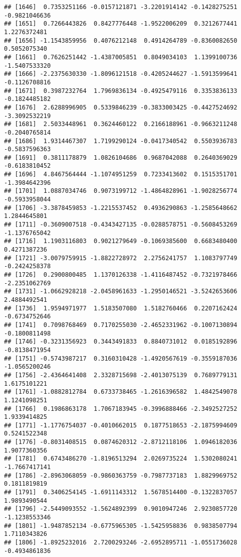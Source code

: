 \documentclass[
]{article}
\begin{document}
\begin{verbatim}
## [1646]  0.7353251166 -0.0157121871 -3.2201914142 -0.1428275251 -0.9821046636
## [1651]  0.7266443826  0.8427776448 -1.9522006209  0.3212677441  1.2276372481
## [1656] -1.1543859956  0.4076212148  0.4914264789 -0.8360082650  0.5052075340
## [1661]  0.7626251442 -1.4387005851  0.8049034103  1.1399100736 -1.5407533320
## [1666] -2.2375630330 -1.8096121518 -0.4205244627 -1.5913599641 -0.1126708816
## [1671]  0.3987232764  1.7969836134 -0.4925479116  0.3353836133 -0.1824485182
## [1676]  2.6288996905  0.5339846239 -0.3833003425 -0.4427524692 -3.3092532219
## [1681]  2.5033448961  0.3624460122  0.2166188961 -0.9663211248 -0.2040765814
## [1686]  1.9314467307  1.7199290124 -0.0417340542  0.5503936783 -0.5837596363
## [1691]  0.3811178879  1.0826104686  0.9687042088  0.2640369029 -0.6183810452
## [1696]  4.8467564444 -1.1074951259  0.7233413602  0.1515351701 -1.3984642396
## [1701]  1.0887034746  0.9073199712 -1.4864828961 -1.9028256774 -0.5933958044
## [1706] -3.3878459853 -1.2215537452  0.4936290863 -1.2585648662  1.2844645801
## [1711] -0.3609007518 -0.4343427135 -0.0288578751 -0.5608453269 -1.1376765042
## [1716]  1.1903116803  0.9021279649 -0.1069385600  0.6683480400  0.4271387236
## [1721] -3.0079759915 -1.8822728972  2.2756241757  1.1083797749 -0.2424258378
## [1726]  0.2900800485  1.1370126338 -1.4116487452 -0.7321978466 -2.2351062769
## [1731] -1.0662928218 -2.0458961633 -1.2950146521 -3.5242653606  2.4884492541
## [1736]  1.9594971977  1.5183507080  1.5182760466  0.2207162424 -0.6734752646
## [1741]  0.7098768469  0.7170255030 -2.4652331962 -0.1007130894 -0.1800811498
## [1746] -0.3231356923  0.3443491833  0.8840731012  0.0185192896 -0.8138471954
## [1751] -0.5743987217  0.3160310428 -1.4920567619 -0.3559187036 -1.0565200246
## [1756] -2.4364641408  2.3328715698 -2.4013075139  0.7689779131  1.6175101221
## [1761] -1.0882812784  0.6733738465 -1.2616396582  1.4842549078  1.1241098251
## [1766]  0.1986863178  1.7067183945 -0.3996888466 -2.3492527252  1.9339414825
## [1771] -1.1776754037 -0.4010662015  0.1877518653 -2.1875994609  0.5241522348
## [1776] -0.8031408515  0.0874620312 -2.8712118106  1.0946182036  1.9077360356
## [1781]  0.6743486270 -1.8196513294  2.0269735224  1.5302080241 -1.7667417141
## [1786] -2.8963068059 -0.9860363759 -0.7987737183  1.8829969752  0.1811819819
## [1791]  0.3406254145 -1.6911143312  1.5678514400 -0.1322837057  1.9893490544
## [1796] -2.5449093552 -1.5624892399  0.9010947246  2.9230857720 -1.1238553346
## [1801] -1.9487852134 -0.6775965305 -1.5425958836  0.9838507794  1.7110343826
## [1806] -1.8925232016  2.7200293246 -2.6952895711 -1.0551736028 -0.4934861836

\end{verbatim}
\end{document}
